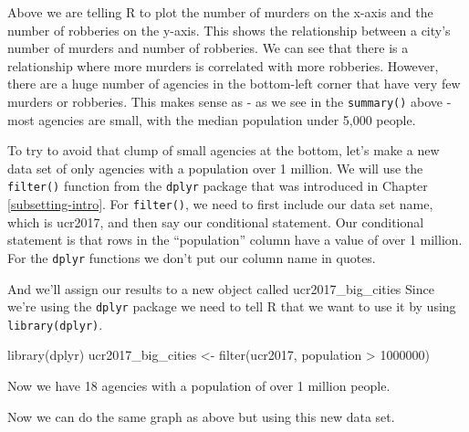 \documentclass[
  a4paper,
]{krantz}
\makeatletter
\newenvironment{Shaded}{\begin{snugshade}}{\end{snugshade}}
\newcommand{\DecValTok}[1]{\textcolor[rgb]{0.06,0.06,0.06}{#1}}
\newcommand{\FunctionTok}[1]{\textcolor[rgb]{0,0,0}{#1}}
\newcommand{\NormalTok}[1]{#1}
\newcommand{\OtherTok}[1]{\textcolor[rgb]{0.37,0.37,0.37}{#1}}
\newcommand{\SpecialCharTok}[1]{\textcolor[rgb]{0,0,0}{#1}}
\newenvironment{kframe}{%
\medskip{}
\setlength{\fboxsep}{.8em}
 \def\at@end@of@kframe{}%
 \ifinner\ifhmode%
  \def\at@end@of@kframe{\end{minipage}}%
  \begin{minipage}{\columnwidth}%
 \fi\fi%
 \def\FrameCommand##1{\hskip\@totalleftmargin \hskip-\fboxsep
 \colorbox{shadecolor}{##1}\hskip-\fboxsep
     \hskip-\linewidth \hskip-\@totalleftmargin \hskip\columnwidth}%
 \MakeFramed {\advance\hsize-\width
   \@totalleftmargin\z@ \linewidth\hsize
   \@setminipage}}%
 {\par\unskip\endMakeFramed%
 \at@end@of@kframe}
\renewenvironment{Shaded}{\begin{kframe}}{\end{kframe}}
\makeatother
\begin{document}
Above we are telling R to plot the number of murders on the
x-axis and the number of robberies on the y-axis. This shows
the relationship between a city's number of murders and
number of robberies. We can see that there is a relationship
where more murders is correlated with more robberies.
However, there are a huge number of agencies in the
bottom-left corner that have very few murders or robberies.
This makes sense as - as we see in the \texttt{summary()}
above - most agencies are small, with the median population
under 5,000 people.

To try to avoid that clump of small agencies at the bottom,
let's make a new data set of only agencies with a population
over 1 million. We will use the \texttt{filter()} function
from the \texttt{dplyr} package that was introduced in
Chapter \ref{subsetting-intro}. For \texttt{filter()}, we
need to first include our data set name, which is ucr2017,
and then say our conditional statement. Our conditional
statement is that rows in the ``population'' column have a
value of over 1 million. For the \texttt{dplyr} functions we
don't put our column name in quotes.

And we'll assign our results to a new object called
ucr2017\_big\_cities Since we're using the \texttt{dplyr}
package we need to tell R that we want to use it by using
\texttt{library(dplyr)}.

\begin{Shaded}
\begin{Highlighting}[]
\FunctionTok{library}\NormalTok{(dplyr)}
\NormalTok{ucr2017\_big\_cities }\OtherTok{\textless{}{-}} \FunctionTok{filter}\NormalTok{(ucr2017, population }\SpecialCharTok{\textgreater{}} \DecValTok{1000000}\NormalTok{)}
\end{Highlighting}
\end{Shaded}

Now we have 18 agencies with a population of over 1 million
people.

Now we can do the same graph as above but using this new
data set.

\begin{Shaded}
\end{Shaded}
\end{document}
